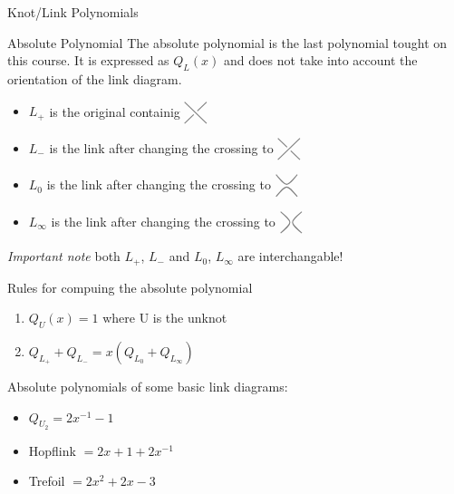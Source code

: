 \documentclass[12pt, letterpaper]{article}
\newcommand{\KP}[1]{%
  \begin{tikzpicture}[baseline=-\dimexpr\fontdimen22\textfont2\relax]
  #1
  \end{tikzpicture}%
}
\newcommand{\UCross}{%
  \KP{
    \draw[color=gray,thick] (-0.3,0.3) -- (0.3,-0.3);
    \draw[color=gray,thick] (-0.3,-0.3) -- (-0.05,-0.05);
    \draw[color=gray,thick] (0.05,0.05) -- (0.3,0.3);
  }%
}
\newcommand{\UOCross}{%
  \KP{
    \draw[color=gray,thick] (-0.3,0.3) -- (-0.05,0.05);
    \draw[color=gray,thick] (0.05,-0.05) -- (0.3,-0.3);
    \draw[color=gray,thick] (-0.3,-0.3) -- (0.3,0.3);
  }%
}
\newcommand{\RSmooth}{%
  \KP{%
    \draw[color=gray,thick] (-0.3,0.3)..controls (0,-0.05).. (0.3,0.3);
    \draw[color=gray,thick] (-0.3,-0.3)..controls (0,0.05).. (0.3,-0.3);
  }%
}
\newcommand{\LSmooth}{%
  \KP{%
    \draw[color=gray,thick] (-0.3,-0.3)..controls (0.05,0).. (-0.3,0.3);
    \draw[color=gray,thick] (0.3,-0.3)..controls (-0.05,0).. (0.3,0.3);
  }%
}
\begin{document}
\begin{section}{Knot/Link Polynomials}
\begin{subsection}{Absolute Polynomial}
    The absolute polynomial is the last polynomial tought on this course.
    It is expressed as \(Q_{L}(x)\) and does not take into account the orientation
    of the link diagram.

    \begin{itemize}
      \item \(L_{+}\) is the original containig \(\UCross\)
      \item \(L_{-}\) is the link after changing the crossing to \(\UOCross\)
      \item \(L_{0}\) is the link after changing the crossing to \(\RSmooth\)
      \item \(L_{\infty}\) is the link after changing the crossing to \(\LSmooth\)
    \end{itemize}
    \emph{Important note} both \(L_{+}\), \(L_{-}\) and  \(L_{0}\), \(L_{\infty}\)
    are interchangable!

    Rules for compuing the absolute polynomial
    \begin{enumerate}
      \item \(Q_{U}(x) = 1\) where U is the unknot
      \item \(Q_{L_{+}} + Q_{L_{-}} = x(Q_{L_{0}} + Q_{L_{\infty}})\)
    \end{enumerate}

    Absolute polynomials of some basic link diagrams:
    \begin{itemize}
      \item \(Q_{U_{2}} = 2x^{-1} - 1\)
      \item Hopflink \(= 2x + 1 + 2x^{-1}\)
      \item Trefoil \(= 2x^{2} + 2x - 3\)
    \end{itemize}

  \end{subsection}

\end{section}
\end{document}
